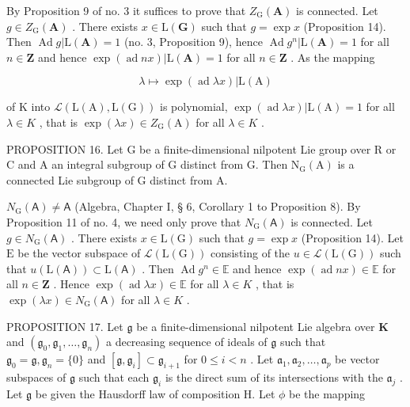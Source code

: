 By Proposition 9 of no. 3 it suffices to prove that \(Z_{\mathrm{G}}(\mathbf{A})\) is connected. Let \(g \in Z_{\mathrm{G}}(\mathbf{A})\) . There exists \(x \in \mathrm{L}(\mathbf{G})\) such that \(g = \exp x\) (Proposition 14). Then \(\operatorname{Ad} g|\mathrm{L}(\mathbf{A}) = 1\) (no. 3, Proposition 9), hence \(\operatorname{Ad} g^n |\mathrm{L}(\mathbf{A}) = 1\) for all \(n \in \mathbf{Z}\) and hence \(\exp (\operatorname{ad} nx)|\mathrm{L}(\mathbf{A}) = 1\) for all \(n \in \mathbf{Z}\) . As the mapping

\[
\lambda \mapsto \exp (\operatorname{ad} \lambda x) | \mathrm{L} (\mathrm{A})
\]

of K into \(\mathcal{L}(\mathrm{L}(\mathrm{A}),\mathrm{L}(\mathrm{G}))\) is polynomial, \(\exp(\operatorname{ad}\lambda x)|\mathrm{L}(\mathrm{A})=1\) for all \(\lambda\in K\) , that is \(\exp(\lambda x)\in Z_{\mathrm{G}}(\mathrm{A})\) for all \(\lambda\in K\) .

PROPOSITION 16. Let G be a finite-dimensional nilpotent Lie group over R or C and A an integral subgroup of G distinct from G. Then \(\mathrm{N}_{\mathrm{G}}(\mathrm{A})\) is a connected Lie subgroup of G distinct from A.

\(N_{\mathrm{G}}(\mathsf{A}) \neq \mathsf{A}\) (Algebra, Chapter I, § 6, Corollary 1 to Proposition 8). By Proposition 11 of no. 4, we need only prove that \(N_{\mathrm{G}}(\mathsf{A})\) is connected. Let \(g \in N_{\mathrm{G}}(\mathsf{A})\) . There exists \(x \in \mathrm{L}(\mathrm{G})\) such that \(g = \exp x\) (Proposition 14). Let \(\mathrm{E}\) be the vector subspace of \(\mathcal{L}(\mathrm{L}(\mathrm{G}))\) consisting of the \(u \in \mathcal{L}(\mathrm{L}(\mathrm{G}))\) such that \(u(\mathrm{L}(\mathsf{A})) \subset \mathrm{L}(\mathsf{A})\) . Then \(\operatorname{Ad} g^n \in \mathbb{E}\) and hence \(\exp (\operatorname{ad} nx) \in \mathbb{E}\) for all \(n \in \mathbf{Z}\) . Hence \(\exp (\operatorname{ad} \lambda x) \in \mathbb{E}\) for all \(\lambda \in K\) , that is \(\exp (\lambda x) \in N_{\mathrm{G}}(\mathsf{A})\) for all \(\lambda \in K\) .

PROPOSITION 17. Let \(\mathfrak{g}\) be a finite-dimensional nilpotent Lie algebra over \(\mathbf{K}\) and \((\mathfrak{g}_0, \mathfrak{g}_1, \ldots, \mathfrak{g}_n)\) a decreasing sequence of ideals of \(\mathfrak{g}\) such that \(\mathfrak{g}_0 = \mathfrak{g}, \mathfrak{g}_n = \{0\}\) and \([\mathfrak{g}, \mathfrak{g}_i] \subset \mathfrak{g}_{i+1}\) for \(0 \leqslant i < n\) . Let \(\mathfrak{a}_1, \mathfrak{a}_2, \ldots, \mathfrak{a}_p\) be vector subspaces of \(\mathfrak{g}\) such that each \(\mathfrak{g}_i\) is the direct sum of its intersections with the \(\mathfrak{a}_j\) . Let \(\mathfrak{g}\) be given the Hausdorff law of composition H. Let \(\phi\) be the mapping

